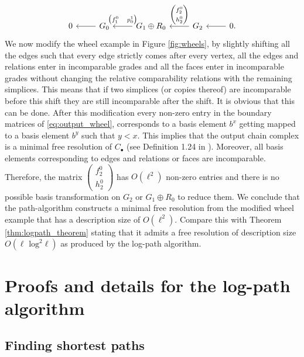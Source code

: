\documentclass[a4paper,UKenglish,cleveref,nolineno,autoref]{socg-lipics-v2021}
\begin{document}
\begin{equation} \label{eq:output_wheel}
\begin{tikzcd}[ampersand replacement=\&]
0 \& G_0  \arrow[l]
  \& G_1\oplus R_0 \arrow{l}[swap]{\begin{pmatrix}f_1^0 & p_0^1 \end{pmatrix}} 
  \& G_2 \arrow{l}[swap]{\begin{pmatrix}f_2^0 \\ h^0_2 \end{pmatrix}} 
  \& 0 \arrow[l] .
\end{tikzcd}
\end{equation}
We now modify the wheel example in Figure \ref{fig:wheels}, by slightly shifting all the edges such that every edge strictly comes after every vertex, all the edges and relations enter in incomparable grades and all the faces enter in incomparable grades without changing the relative comparability relations with the remaining simplices. This means that if two simplices (or copies thereof) are incomparable before this shift they are still incomparable after the shift. It is obvious that this can be done. After this modification every non-zero entry in the boundary matrices of \eqref{eq:output_wheel}, corresponds to a basis element $b^x$ getting mapped to a basis element $b^y$ such that $y<x$. This implies that the output chain complex is a minimal free resolution of $C_\bullet$ (see Definition 1.24 in \cite{miller_sturmfels_book}). Moreover, all basis elements corresponding to edges and relations or faces are incomparable. Therefore, the matrix $\begin{pmatrix}f_2^0 \\ h^0_2 \end{pmatrix}$ has $O(\ell^2)$ non-zero entries and there is no possible basis transformation on $G_2$ or $G_1\oplus R_0$ to reduce them. We conclude that the path-algorithm constructs a minimal free resolution from the modified wheel example that has a description size of $O(\ell^2)$. Compare this with Theorem \ref{thm:logpath_theorem} stating that it admits a free resolution of description size $O(\ell\text{ log}^2\ell)$ as produced by the log-path algorithm.  

\section{Proofs and details for the log-path algorithm} \label{app:logpath}

\subsection{Finding shortest paths} \label{app:shortest_paths}
\end{document}
